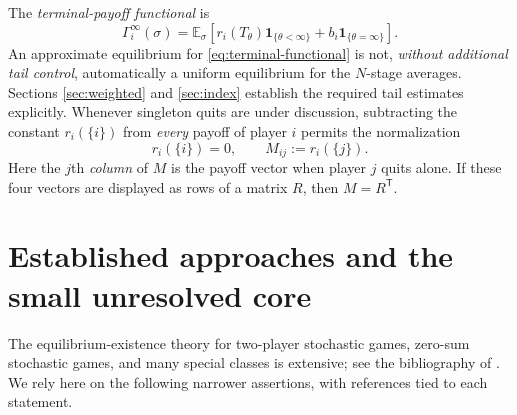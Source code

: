 \documentclass[11pt,a4paper]{article}
\theoremstyle{definition}
\theoremstyle{remark}
\newcommand{\E}{\mathbb{E}}
\newcommand{\one}{\mathbf{1}}
\begin{document}
The \emph{terminal-payoff functional} is
\begin{equation}\label{eq:terminal-functional}
\Gamma_i^\infty(\sigma)=\E_\sigma\left[r_i(T_\theta)\one_{\{\theta<\infty\}}+b_i\one_{\{\theta=\infty\}}\right].
\end{equation}
An approximate equilibrium for \eqref{eq:terminal-functional} is not, \emph{without additional tail control}, automatically a uniform equilibrium for the $N$-stage averages. Sections \ref{sec:weighted} and \ref{sec:index} establish the required tail estimates explicitly. Whenever singleton quits are under discussion, subtracting the constant $r_i(\{i\})$ from \emph{every} payoff of player $i$ permits the normalization
\begin{equation}\label{eq:normalize}
r_i(\{i\})=0,\qquad M_{ij}:=r_i(\{j\}).
\end{equation}
Here the $j$th \emph{column} of $M$ is the payoff vector when player $j$ quits alone. If these four vectors are displayed as rows of a matrix $R$, then $M=R^{\mathsf T}$.

\section{Established approaches and the small unresolved core}\label{sec:literature}
The equilibrium-existence theory for two-player stochastic games, zero-sum stochastic games, and many special classes is extensive; see the bibliography of \cite{akrs2024,sv2025}. We rely here on the following narrower assertions, with references tied to each statement.
\end{document}
